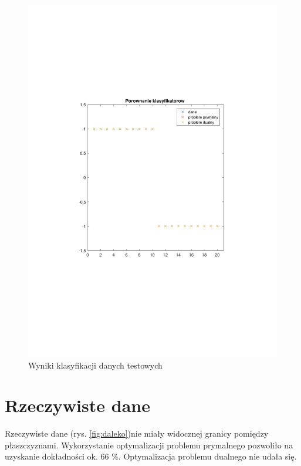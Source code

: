 \documentclass[]{article}
\begin{document}
\begin{figure}[H]
	\centering
	\includegraphics[width=0.9\linewidth]{dane_testowe}
	\caption{Wyniki klasyfikacji danych testowych}
	\label{fig:blisko}
\end{figure}


\section{Rzeczywiste dane}
Rzeczywiste dane (rys. \ref{fig:daleko})nie miały widocznej granicy pomiędzy płaszczyznami. Wykorzystanie optymalizacji problemu prymalnego pozwoliło na uzyskanie dokładności ok. 66 \%. Optymalizacja problemu dualnego nie udała się. 
\end{document}
